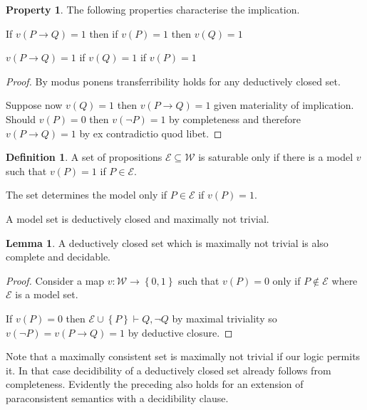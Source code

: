 \documentclass{amsbook}
\newcommand{\setsm}[1]{\left\{#1\right\}}
\newcommand{\wffs}{\mathcal W}
\newcommand{\infers}{\mathrel\vdash}
\newcommand{\then}{\mathrel\rightarrow}
\theoremstyle{definition}
\newtheorem{prop}{Property}[section]
\newtheorem{lmm}{Lemma}[section]
\newtheorem{dfn}{Definition}[section]
\begin{document}
\begin{prop}
    The following properties characterise the implication.
    \begin{description}[
            labelindent=\parindent,
            before={
                    \renewcommand\makelabel[1]{(##1).}
                }
        ]
        \item[transferrable] If $v(P \then Q) = 1$ then if $v(P) = 1$ then $v(Q) = 1$
        \item[decidable] $v(P \then Q) = 1$ if $v(Q) = 1$ if $v(P) = 1$
    \end{description}
    \begin{proof}
        By modus ponens transferribility holds for any deductively closed set.

        Suppose now $v(Q) = 1$ then $v(P \then Q) = 1$ given materiality of implication. Should $v(P) = 0$ then $v(\neg P) = 1$ by completeness and therefore $v(P \then Q) = 1$ by ex contradictio quod libet.
    \end{proof}
\end{prop}

\begin{dfn}
    A set of propositions $\mathcal E \subseteq \wffs$ is saturable only if there is a model $v$ such that $v(P) = 1$ if $P \in \mathcal E$.

    The set determines the model only if $P \in \mathcal E$ if $v(P) = 1$.

    A model set is deductively closed and maximally not trivial.
\end{dfn}

\begin{lmm}
    A deductively closed set which is maximally not trivial is also complete and decidable.
    \begin{proof}
        Consider a map $v: \wffs \longrightarrow \setsm{0,1}$ such that $v(P) = 0$ only if $P \notin \mathcal E$ where $\mathcal E$ is a model set.

        If $v(P) = 0$ then $\mathcal E \cup \setsm P \infers Q, \neg Q$ by maximal triviality so $v(\neg P) = v(P \then Q) = 1$ by deductive closure.
    \end{proof}
\end{lmm}


Note that a maximally consistent set is maximally not trivial if our logic permits it. In that case decidibility of a deductively closed set already follows from completeness. Evidently the preceding also holds for an extension of paraconsistent semantics with a decidibility clause.
\end{document}
